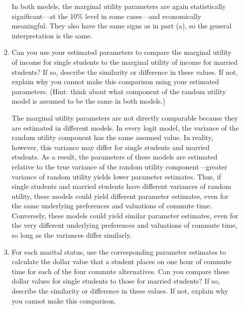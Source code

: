 \documentclass[11pt,letterpaper]{article}\usepackage[]{graphicx}\usepackage[]{xcolor}
\begin{document}
\begin{enumerate}[label=\alph*., leftmargin=*]
\begin{enumerate}[label=\roman*.]
		In both models, the marginal utility parameters are again statistically significant---at the 10\% level in some cases---and economically meaningful. They also have the same signs as in part (a), so the general interpretation is the same.
		
		\item Can you use your estimated parameters to compare the marginal utility of income for single students to the marginal utility of income for married students? If so, describe the similarity or difference in these values. If not, explain why you cannot make this comparison using your estimated parameters. (Hint: think about what component of the random utility model is assumed to be the same in both models.)
		
		The marginal utility parameters are not directly comparable because they are estimated in different models. In every logit model, the variance of the random utility component has the same assumed value. In reality, however, this variance may differ for single students and married students. As a result, the parameters of these models are estimated relative to the true variance of the random utility component---greater variance of random utility yields lower parameter estimates. Thus, if single students and married students have different variances of random utility, these models could yield different parameter estimates, even for the same underlying preferences and valuations of commute time. Conversely, these models could yield similar parameter estimates, even for the very different underlying preferences and valuations of commute time, so long as the variances differ similarly.

		\item For each marital status, use the corresponding parameter estimates to calculate the dollar value that a student places on one hour of commute time for each of the four commute alternatives. Can you compare these dollar values for single students to those for married students? If so, describe the similarity or difference in these values. If not, explain why you cannot make this comparison.


\end{enumerate}
\end{enumerate}
\end{document}
